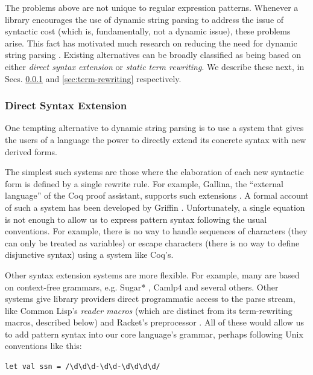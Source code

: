 The problems above are not unique to regular expression patterns. Whenever a library encourages the use of dynamic string parsing to address the issue of syntactic cost (which is, fundamentally, not a dynamic issue), these problems arise. %
	This fact has motivated much research on reducing the need for dynamic string parsing \cite{Bravenboer:2007:PIA:1289971.1289975}. Existing alternatives can be broadly classified as being based on either \emph{direct syntax extension} or \emph{static term rewriting}. We describe these next, in Secs. \ref{sec:syntax-extension} and \ref{sec:term-rewriting} respectively.%

\subsubsection{Direct Syntax Extension}\label{sec:syntax-extension}
One tempting alternative to dynamic string parsing is to use a system that gives the users of a language the power to directly extend its concrete syntax with new derived forms. %

The simplest such systems are those where the elaboration of each new syntactic form is defined by a single rewrite rule. For example, Gallina, the ``external language'' of the Coq proof assistant, supports such extensions \cite{Coq:manual}. A formal account of such a system has been developed by Griffin \cite{5134}. Unfortunately, a single equation is not enough to allow us to express pattern syntax following the usual conventions. For example, there is no way to handle sequences of characters (they can only be treated as variables) or escape characters (there is no way to define disjunctive syntax) using a system like Coq's.

Other syntax extension systems are more flexible. For example, many are based on context-free grammars, e.g.  Sugar* \cite{erdweg2013framework}, Camlp4 \cite{ocaml-manual} and several others. Other systems give library providers direct programmatic access to the parse stream, like Common Lisp's \emph{reader macros} \cite{steele1990common} (which are distinct from its term-rewriting macros, described below) and Racket's preprocessor \cite{Flatt:2012:CLR:2063176.2063195}. All of these would allow us to add pattern syntax into our core language's grammar, perhaps following Unix conventions like this:
\begin{lstlisting}[numbers=none]
let val ssn = /\d\d\d-\d\d-\d\d\d\d/
\end{lstlisting}

